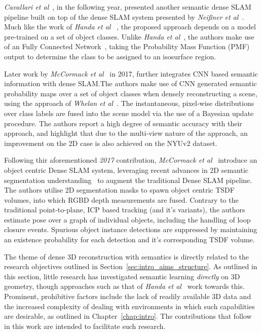 \textit{Cavallari et al}~\cite{Cavallari2016}, in the following year, presented another 
semantic dense SLAM pipeline built on top of the dense SLAM system presented by 
\textit{Nei{\ss}ner et al}~\cite{NieBner2013}. Much like the work of \textit{Handa et al} 
~\cite{Handa2015}, the proposed approach depends on a model pre-trained on a set of object 
classes. Unlike \textit{Handa et al}~\cite{Handa2015}, the authors make use of an 
Fully Connected Network~\cite{Long2015}, taking the Probability Mass Function (PMF) 
output to determine the class to be assigned to an isosurface region.

Later work by \textit{McCormack et al}~\cite{McCormac2017} in 2017, further integrates CNN based 
semantic information with dense SLAM.\@ The authors make use of CNN generated semantic probability 
maps over a set of object classes when densely reconstructing a scene, using the approach of 
\textit{Whelan et al}~\cite{Whelan2016}. The instantaneous, pixel-wise distributions over class labels 
are fused into the scene model via the use of a Bayesian update procedure. The authors report a high 
degree of semantic accuracy with their approach, and highlight that due to the multi-view nature of the 
approach, an improvement on the 2D case is also achieved on the NYUv2 dataset.

Following thir aforementioned \textit{2017} contribution, \textit{McCormack et al}~\cite{McCormac2018} 
introduce an object centric Dense SLAM system, leveraging recent advances in 2D semantic segmentation 
understanding~\cite{He2017} to augment the traditional Dense SLAM pipeline. The authors utilise 2D 
segmentation masks to spawn object centric TSDF volumes, into which RGBD depth measurements are fused. 
Contrary to the traditional point-to-plane, ICP based tracking (and it's variants), the authors estimate 
pose over a graph of individual objects, including the handling of loop closure events. Spurious object 
instance detections are suppressed by maintaining an existence probability for each detection and it's 
corresponding TSDF volume.

The theme of dense 3D reconstruction with semantics is directly related to the research objectives 
outlined in Section~\ref{sec:intro_aims_structure}. As outlined in this section, little research has 
investigated semantic learning \textit{directly} on 3D geometry, though approaches such as that of 
\textit{Handa et al}~\cite{Handa2015} work towards this. Prominent, prohibitive factors include the 
lack of readily available 3D data and the increased complexity of dealing with environments in which 
such capabilities are desirable, as outlined in Chapter~\ref{chap:intro}. The contributions that follow 
in this work are intended to facilitate such research.

